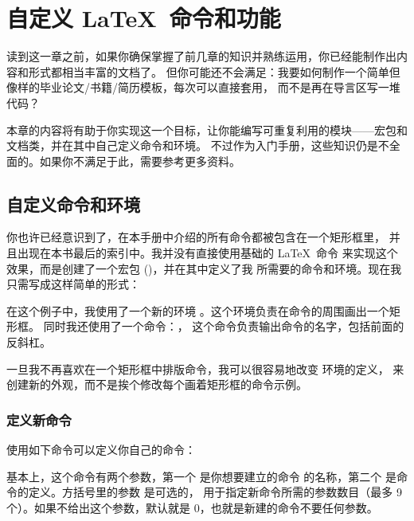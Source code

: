 \chapter{自定义 \LaTeX\ 命令和功能}

\begin{intro}
读到这一章之前，如果你确保掌握了前几章的知识并熟练运用，你已经能制作出内容和形式都相当丰富的文档了。
但你可能还不会满足：我要如何制作一个简单但像样的毕业论文/书籍/简历模板，每次可以直接套用，
而不是再在导言区写一堆代码？

本章的内容将有助于你实现这一个目标，让你能编写可重复利用的模块——宏包和文档类，并在其中自己定义命令和环境。
不过作为入门手册，这些知识仍是不全面的。如果你不满足于此，需要参考更多资料。
\end{intro}

\section{自定义命令和环境}\label{sec:newcommands}

你也许已经意识到了，在本手册中介绍的所有命令都被包含在一个矩形框里，
并且出现在本书最后的索引中。我并没有直接使用基础的 \LaTeX\ 命令
来实现这个效果，而是创建了一个宏包 ()，并在其中定义了我
所需要的命令和环境。现在我只需写成这样简单的形式：

\begin{example}
\begin{command}
\end{command}
\end{example}

在这个例子中，我使用了一个新的环境 。这个环境负责在命令的周围画出一个矩形框。
同时我还使用了一个命令：， 这个命令负责输出命令的名字，包括前面的反斜杠。

一旦我不再喜欢在一个矩形框中排版命令，我可以很容易地改变  环境的定义，
来创建新的外观，而不是挨个修改每个画着矩形框的命令示例。

\subsection{定义新命令}

使用如下命令可以定义你自己的命令：
\begin{command}
\end{command}
基本上，这个命令有两个参数，第一个  是你想要建立的命令
的名称，第二个  是命令的定义。方括号里的参数  是可选的，
用于指定新命令所需的参数数目（最多 9 个）。如果不给出这个参数，默认就是 0，也就是新建的命令不要任何参数。

